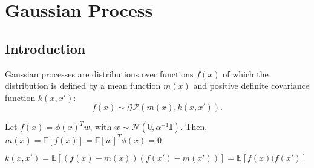 \chapter{Gaussian Process}
\section{Introduction}
\label{sec:gaussian_process}
Gaussian processes are distributions over functions $f(x)$ of which the distribution is defined by a mean function $m(x)$ and positive definite covariance function $k(x,x')$:
$$f(x) \sim \mathcal{GP}(m(x),k(x,x')).$$

Let $f(x) = \phi(x)^Tw$, with $w\sim \mathcal{N}(0, \alpha^{-1}\mathbf{I})$. Then, $m(x) = \mathbb{E}[f(x)] = \mathbb{E}[w]^T\phi(x) = 0$

$k(x, x') = \mathbb{E}[(f(x)-m(x))(f(x')-m(x'))] =\mathbb{E}[f(x)(f(x')] $

